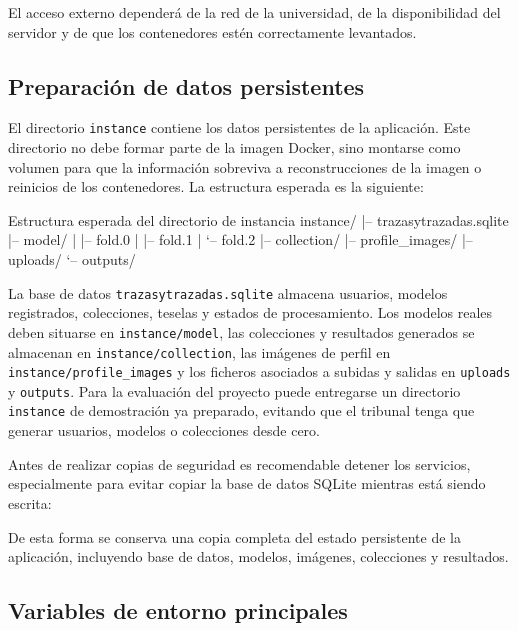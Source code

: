 El acceso externo dependerá de la red de la universidad, de la disponibilidad del servidor y de que los contenedores estén correctamente levantados.

\subsection{Preparación de datos persistentes}

El directorio \texttt{instance} contiene los datos persistentes de la aplicación. Este directorio no debe formar parte de la imagen Docker, sino montarse como volumen para que la información sobreviva a reconstrucciones de la imagen o reinicios de los contenedores. La estructura esperada es la siguiente:

\begin{infocmdbox}{Estructura esperada del directorio de instancia}
instance/
|-- trazasytrazadas.sqlite
|-- model/
|   |-- fold.0
|   |-- fold.1
|   `-- fold.2
|-- collection/
|-- profile_images/
|-- uploads/
`-- outputs/
\end{infocmdbox}

La base de datos \texttt{trazasytrazadas.sqlite} almacena usuarios, modelos registrados, colecciones, teselas y estados de procesamiento. Los modelos reales deben situarse en \texttt{instance/model}, las colecciones y resultados generados se almacenan en \texttt{instance/collection}, las imágenes de perfil en \texttt{instance/profile\_images} y los ficheros asociados a subidas y salidas en \texttt{uploads} y \texttt{outputs}. Para la evaluación del proyecto puede entregarse un directorio \texttt{instance} de demostración ya preparado, evitando que el tribunal tenga que generar usuarios, modelos o colecciones desde cero.

Antes de realizar copias de seguridad es recomendable detener los servicios, especialmente para evitar copiar la base de datos SQLite mientras está siendo escrita:


De esta forma se conserva una copia completa del estado persistente de la aplicación, incluyendo base de datos, modelos, imágenes, colecciones y resultados.

\subsection{Variables de entorno principales}

